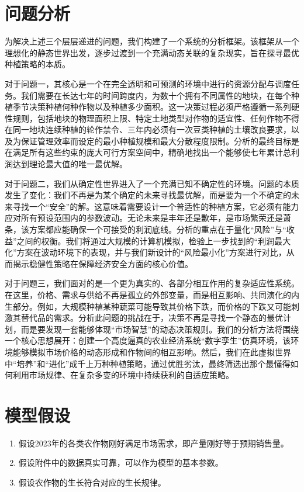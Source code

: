 \documentclass[withoutpreface,bwprint]{cumcmthesis} %
\begin{document}
\section{问题分析}


为解决上述三个层层递进的问题，我们构建了一个系统的分析框架。该框架从一个理想化的静态世界出发，逐步过渡到一个充满动态关联的复杂现实，旨在探寻最优种植策略的本质。

对于问题一，其核心是一个在完全透明和可预测的环境中进行的资源分配与调度任务。我们需要在长达七年的时间跨度内，为数十个拥有不同属性的地块，在每个种植季节决策种植何种作物以及种植多少面积。这一决策过程必须严格遵循一系列硬性规则，包括地块的物理面积上限、特定土地类型对作物的适宜性、任何作物不得在同一地块连续种植的轮作禁令、三年内必须有一次豆类种植的土壤改良要求，以及为保证管理效率而设定的最小种植规模和最大分散程度限制。分析的最终目标是在满足所有这些约束的庞大可行方案空间中，精确地找出一个能够使七年累计总利润达到理论最大值的唯一最优解。

对于问题二，我们从确定性世界进入了一个充满已知不确定性的环境。问题的本质发生了变化：我们不再是为某个确定的未来寻找最优解，而是要为一个不确定的未来寻找一个“安全”的解。这意味着需要设计一个普适性的种植方案，它必须有能力应对所有预设范围内的参数波动。无论未来是丰年还是歉年，是市场繁荣还是萧条，该方案都应能确保一个可接受的利润底线。分析的重点在于量化“风险”与“收益”之间的权衡。我们将通过大规模的计算机模拟，检验上一步找到的“利润最大化”方案在波动环境下的表现，并与我们新设计的“风险最小化”方案进行对比，从而揭示稳健性策略在保障经济安全方面的核心价值。

对于问题三，我们面对的是一个更为真实的、各部分相互作用的复杂适应性系统。在这里，价格、需求与供给不再是孤立的外部变量，而是相互影响、共同演化的内生部分。例如，大规模种植某种蔬菜可能导致其价格下跌，而价格的下跌又可能刺激其替代品的需求。分析此问题的挑战在于，决策不再是寻找一个静态的最优计划，而是要发现一套能够体现“市场智慧”的动态决策规则。我们的分析方法将围绕一个核心思想展开：创建一个高度逼真的农业经济系统“数字孪生”仿真环境，该环境能够模拟市场价格的动态形成和作物间的相互影响。然后，我们在此虚拟世界中“培养”和“进化”成千上万种种植策略，通过优胜劣汰，最终筛选出那个最懂得如何利用市场规律、在复杂多变的环境中持续获利的自适应策略。



\section{模型假设}

\begin{enumerate}
	\item 假设2023年的各类农作物刚好满足市场需求，即产量刚好等于预期销售量。
	\item 假设附件中的数据真实可靠，可以作为模型的基本参数。
	\item 假设农作物的生长符合对应的生长规律。
\end{enumerate}
\end{document}
